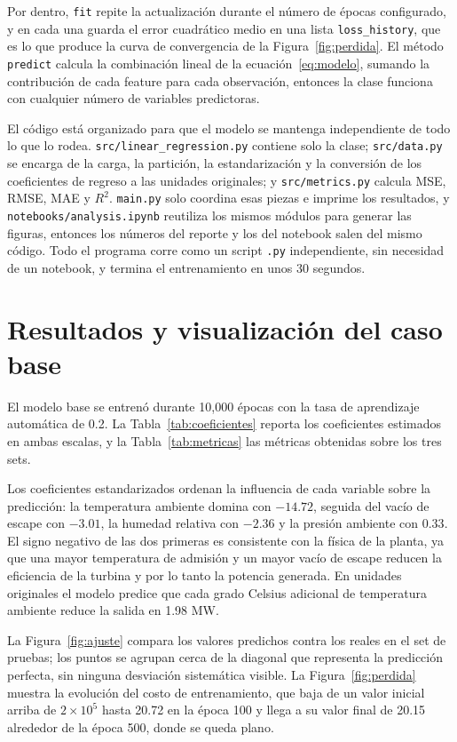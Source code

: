 \documentclass[conference]{IEEEtran}
\begin{document}
Por dentro, \texttt{fit} repite la actualización durante el número de épocas configurado, y en cada una guarda el error cuadrático medio en una lista \texttt{loss\_history}, que es lo que produce la curva de convergencia de la Figura~\ref{fig:perdida}. El método \texttt{predict} calcula la combinación lineal de la ecuación~\ref{eq:modelo}, sumando la contribución de cada feature para cada observación, entonces la clase funciona con cualquier número de variables predictoras.

El código está organizado para que el modelo se mantenga independiente de todo lo que lo rodea. \texttt{src/linear\_regression.py} contiene solo la clase; \texttt{src/data.py} se encarga de la carga, la partición, la estandarización y la conversión de los coeficientes de regreso a las unidades originales; y \texttt{src/metrics.py} calcula MSE, RMSE, MAE y $R^2$. \texttt{main.py} solo coordina esas piezas e imprime los resultados, y \texttt{notebooks/analysis.ipynb} reutiliza los mismos módulos para generar las figuras, entonces los números del reporte y los del notebook salen del mismo código. Todo el programa corre como un script \texttt{.py} independiente, sin necesidad de un notebook, y termina el entrenamiento en unos 30 segundos.

\section{Resultados y visualización del caso base}
\label{sec:resultados}
El modelo base se entrenó durante 10,000 épocas con la tasa de aprendizaje automática de 0.2. La Tabla~\ref{tab:coeficientes} reporta los coeficientes estimados en ambas escalas, y la Tabla~\ref{tab:metricas} las métricas obtenidas sobre los tres sets.

Los coeficientes estandarizados ordenan la influencia de cada variable sobre la predicción: la temperatura ambiente domina con $-14.72$, seguida del vacío de escape con $-3.01$, la humedad relativa con $-2.36$ y la presión ambiente con $0.33$. El signo negativo de las dos primeras es consistente con la física de la planta, ya que una mayor temperatura de admisión y un mayor vacío de escape reducen la eficiencia de la turbina y por lo tanto la potencia generada. En unidades originales el modelo predice que cada grado Celsius adicional de temperatura ambiente reduce la salida en 1.98 MW.

La Figura~\ref{fig:ajuste} compara los valores predichos contra los reales en el set de pruebas; los puntos se agrupan cerca de la diagonal que representa la predicción perfecta, sin ninguna desviación sistemática visible. La Figura~\ref{fig:perdida} muestra la evolución del costo de entrenamiento, que baja de un valor inicial arriba de $2 \times 10^{5}$ hasta 20.72 en la época 100 y llega a su valor final de 20.15 alrededor de la época 500, donde se queda plano.
\end{document}
